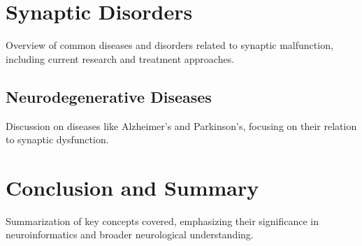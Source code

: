 \documentclass{article}
\begin{document}
\section{Synaptic Disorders}
Overview of common diseases and disorders related to synaptic malfunction, including current research and treatment approaches.

\subsection{Neurodegenerative Diseases}
Discussion on diseases like Alzheimer's and Parkinson's, focusing on their relation to synaptic dysfunction.

\section{Conclusion and Summary}
Summarization of key concepts covered, emphasizing their significance in neuroinformatics and broader neurological understanding.
\end{document}
